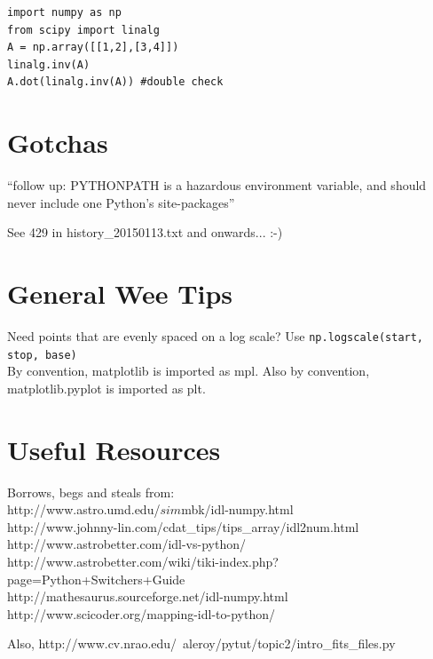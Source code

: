\documentclass[11pt,a4paper]{article}
\begin{document}
\begin{lstlisting}
import numpy as np
from scipy import linalg
A = np.array([[1,2],[3,4]])
linalg.inv(A)
A.dot(linalg.inv(A)) #double check
\end{lstlisting}



\section{Gotchas}
``follow up: PYTHONPATH is a hazardous environment variable, and should never include one Python's site-packages'' 

See 429 in history\_20150113.txt and onwards... :-) 



\section*{General Wee Tips}
Need points that are evenly spaced on a log scale? Use {\tt np.logscale(start, stop, base)} \\
By convention, matplotlib is imported as mpl. Also by convention, matplotlib.pyplot is imported as plt.\\




\section*{Useful Resources}
Borrows, begs and steals from: \\
http://www.astro.umd.edu/$sim$mbk/idl-numpy.html\\
http://www.johnny-lin.com/cdat\_tips/tips\_array/idl2num.html\\
http://www.astrobetter.com/idl-vs-python/ \\
http://www.astrobetter.com/wiki/tiki-index.php?page=Python+Switchers+Guide \\
http://mathesaurus.sourceforge.net/idl-numpy.html
http://www.scicoder.org/mapping-idl-to-python/

\noindent
Also, 
http://www.cv.nrao.edu/~aleroy/pytut/topic2/intro\_fits\_files.py

\noindent
\end{document}
